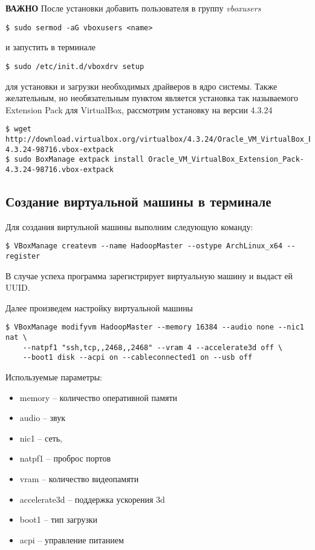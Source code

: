 \noindent\textbf{ВАЖНО} После установки добавить пользователя в группу \emph{vboxusers} \\
\begin{lstlisting}
$ sudo sermod -aG vboxusers <name>
\end{lstlisting}
и запустить в терминале
\begin{lstlisting}
$ sudo /etc/init.d/vboxdrv setup
\end{lstlisting}
для установки и загрузки необходимых драйверов в ядро системы. Также желательным, но необязательным пунктом является установка так называемого 
Extension Pack для VirtualBox, рассмотрим установку на версии 4.3.24
\begin{lstlisting}
$ wget http://download.virtualbox.org/virtualbox/4.3.24/Oracle_VM_VirtualBox_Extension_Pack-4.3.24-98716.vbox-extpack
$ sudo BoxManage extpack install Oracle_VM_VirtualBox_Extension_Pack-4.3.24-98716.vbox-extpack
\end{lstlisting}

\subsection{Создание виртуальной машины в терминале}
Для создания виртульной машины выполним следующую команду:
\begin{lstlisting}
$ VBoxManage createvm --name HadoopMaster --ostype ArchLinux_x64 --register
\end{lstlisting}
В случае успеха программа зарегистрирует виртуальную машину и выдаст ей UUID.

Далее произведем настройку виртуальной машины
\begin{lstlisting}
$ VBoxManage modifyvm HadoopMaster --memory 16384 --audio none --nic1 nat \
    --natpf1 "ssh,tcp,,2468,,2468" --vram 4 --accelerate3d off \
    --boot1 disk --acpi on --cableconnected1 on --usb off
\end{lstlisting}
Используемые параметры:
\begin{itemize}
    \item memory -- количество оперативной памяти
    \item audio -- звук
    \item nic1 -- сеть, 
    \item natpf1 -- проброс портов
    \item vram -- количество видеопамяти
    \item accelerate3d -- поддержка ускорения 3d
    \item boot1 -- тип загрузки
    \item acpi -- управление питанием
\end{itemize}

